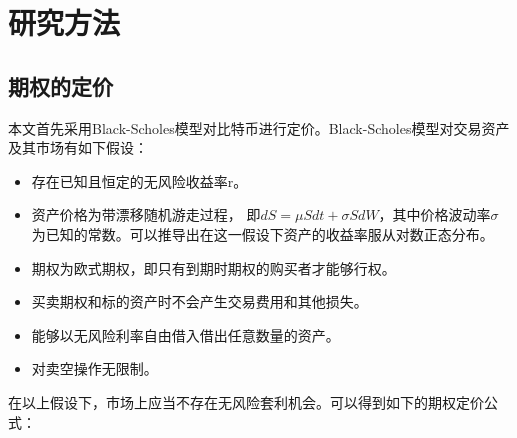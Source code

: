 \chapter{研究方法}
    \section{期权的定价}
    本文首先采用Black-Scholes模型\cite{10.2307/1831029}对比特币进行定价。Black-Scholes模型对交易资产及其市场有如下假设：
    \begin{itemize}
        \item 存在已知且恒定的无风险收益率r。
        \item 资产价格为带漂移随机游走过程， 即$dS={\mu}Sdt+{\sigma}SdW$，其中价格波动率$\sigma$为已知的常数。可以推导出在这一假设下资产的收益率服从对数正态分布。
        \item 期权为欧式期权，即只有到期时期权的购买者才能够行权。
        \item 买卖期权和标的资产时不会产生交易费用和其他损失。
        \item 能够以无风险利率自由借入借出任意数量的资产。
        \item 对卖空操作无限制。
    \end{itemize}
    在以上假设下，市场上应当不存在无风险套利机会。可以得到如下的期权定价公式：
